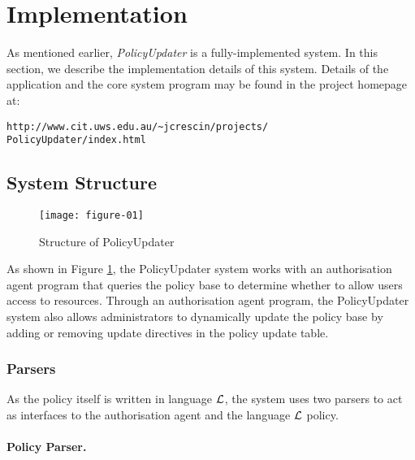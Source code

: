 \documentclass[glov2,twocolumn,final]{svjour2}
\newenvironment{vquote}
  {\begin{list}{}{\leftmargin 1em}\item[]}
  {\end{list}}
\begin{document}
  \section{Implementation}
    \label{sec-implement}

    As mentioned earlier, {\em PolicyUpdater} is a fully-implemented system.
    In this section, we describe the implementation details of this system.
    Details of the application and the core system program may be found in
    the project homepage at:

    \begin{vquote}
      {\tt\scriptsize http://www.cit.uws.edu.au/\~{}jcrescin/projects/} \\
      {\tt\scriptsize PolicyUpdater/index.html}
    \end{vquote}

    \subsection{System Structure}

    \begin{figure}[ht]
      \begin{center}
        \texttt{[image: figure-01]}
        \caption{Structure of PolicyUpdater}
        \label{fig-1}
      \end{center}
    \end{figure}

      As shown in Figure \ref{fig-1}, the PolicyUpdater system works with an
      authorisation agent program that queries the policy base to determine
      whether to allow users access to resources. Through an authorisation
      agent program, the PolicyUpdater system also allows administrators to
      dynamically update the policy base by adding or removing update
      directives in the policy update table.

      \subsubsection{Parsers}

        As the policy itself is written in language ${\cal L}$, the system uses
        two parsers to act as interfaces to the authorisation agent and
        the language ${\cal L}$ policy.

        \paragraph{Policy Parser.}
\end{document}
